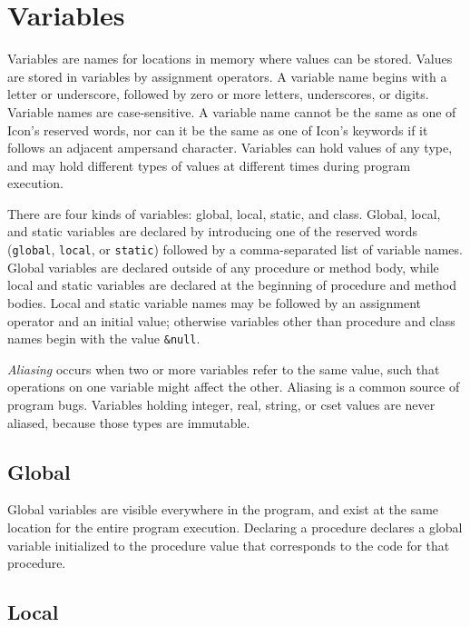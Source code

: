 \section{Variables}

Variables are names for locations in memory where values can be stored.
Values are stored in variables by assignment
operators. A variable name begins with a letter or
underscore, followed by zero or more letters, underscores, or digits.
Variable names are case-sensitive.
A variable name cannot be the same as one of Icon's
reserved words, nor can it be the same as one of
Icon's keywords if it follows an adjacent ampersand
character. Variables can hold values of any type, and may hold
different types of values at different times during program execution.

There are four kinds of variables: global,
local, static, and class. Global,
local, and static variables are declared by introducing one of the
reserved words (\texttt{global}, \texttt{local}, or \texttt{static})
followed by a comma-separated list of variable names. Global variables
are declared outside of any procedure or method body, while local and
static variables are declared at the beginning of procedure and method
bodies. Local and static variable names may be followed by
an assignment operator and an initial value; otherwise variables
other than procedure and class names begin with the value
\texttt{\&null}.

\textit{Aliasing} occurs when two or more variables
refer to the same value, such that operations on one variable might
affect the other. Aliasing is a common source of program bugs.
Variables holding integer, real, string, or cset values are never
aliased, because those types are immutable.

\subsection*{Global}

Global variables are visible everywhere in the program, and exist at the same
location for the entire program execution. Declaring a procedure declares a
global variable initialized to the procedure value that corresponds to the
code for that procedure.

\subsection*{Local}

